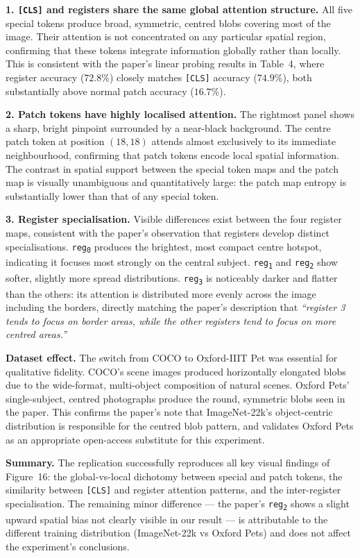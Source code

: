 \documentclass[12pt]{article}
\begin{document}
\textbf{1. \texttt{[CLS]} and registers share the same global attention structure.}
All five special tokens produce broad, symmetric, centred blobs covering most of the image. Their attention is not concentrated on any particular spatial region, confirming that these tokens integrate information globally rather than locally. This is consistent with the paper's linear probing results in Table~4, where register accuracy ($72.8\%$) closely matches \texttt{[CLS]} accuracy ($74.9\%$), both substantially above normal patch accuracy ($16.7\%$).

\textbf{2. Patch tokens have highly localised attention.}
The rightmost panel shows a sharp, bright pinpoint surrounded by a near-black background. The centre patch token at position $(18, 18)$ attends almost exclusively to its immediate neighbourhood, confirming that patch tokens encode local spatial information. The contrast in spatial support between the special token maps and the patch map is visually unambiguous and quantitatively large: the patch map entropy is substantially lower than that of any special token.

\textbf{3. Register specialisation.}
Visible differences exist between the four register maps, consistent with the paper's observation that registers develop distinct specialisations. \texttt{reg\textsubscript{0}} produces the brightest, most compact centre hotspot, indicating it focuses most strongly on the central subject. \texttt{reg\textsubscript{1}} and \texttt{reg\textsubscript{2}} show softer, slightly more spread distributions. \texttt{reg\textsubscript{3}} is noticeably darker and flatter than the others: its attention is distributed more evenly across the image including the borders, directly matching the paper's description that \textit{``register 3 tends to focus on border areas, while the other registers tend to focus on more centred areas.''}

\textbf{Dataset effect.}
The switch from COCO to Oxford-IIIT Pet was essential for qualitative fidelity. COCO's scene images produced horizontally elongated blobs due to the wide-format, multi-object composition of natural scenes. Oxford Pets' single-subject, centred photographs produce the round, symmetric blobs seen in the paper. This confirms the paper's note that ImageNet-22k's object-centric distribution is responsible for the centred blob pattern, and validates Oxford Pets as an appropriate open-access substitute for this experiment.

\textbf{Summary.}
The replication successfully reproduces all key visual findings of Figure~16: the global-vs-local dichotomy between special and patch tokens, the similarity between \texttt{[CLS]} and register attention patterns, and the inter-register specialisation. The remaining minor difference --- the paper's \texttt{reg\textsubscript{2}} shows a slight upward spatial bias not clearly visible in our result --- is attributable to the different training distribution (ImageNet-22k vs Oxford Pets) and does not affect the experiment's conclusions.

\onecolumn


\clearpage
\end{document}

